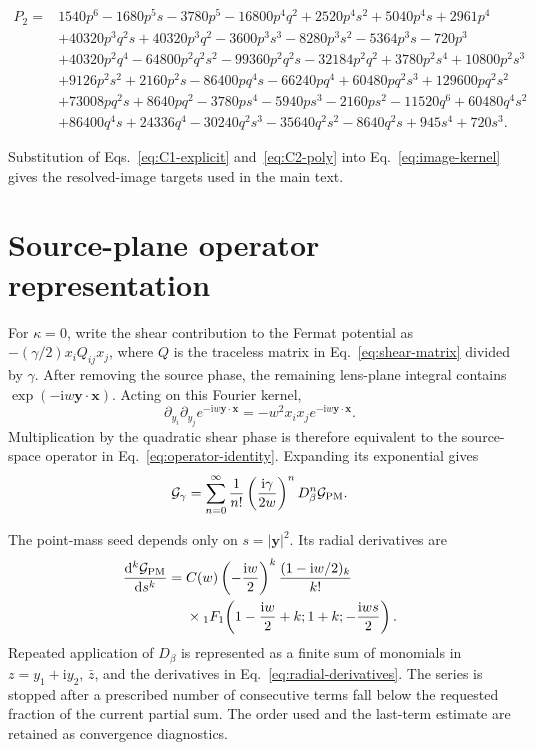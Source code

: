 \documentclass[aps,prd,twocolumn,nofootinbib,superscriptaddress,floatfix]{revtex4-2}
\newcommand{\ii}{\mathrm{i}}
\newcommand{\dd}{\mathrm{d}}
\newcommand{\bx}{\bm{x}}
\newcommand{\by}{\bm{y}}
\newcommand{\cG}{\mathcal{G}}
\begin{document}
\begin{widetext}
\begin{align}
P_2={}&1540p^6-1680p^5s-3780p^5-16800p^4q^2
+2520p^4s^2+5040p^4s+2961p^4\nonumber\\
&+40320p^3q^2s+40320p^3q^2-3600p^3s^3-8280p^3s^2
-5364p^3s-720p^3\nonumber\\
&+40320p^2q^4-64800p^2q^2s^2-99360p^2q^2s-32184p^2q^2
+3780p^2s^4+10800p^2s^3\nonumber\\
&+9126p^2s^2+2160p^2s-86400pq^4s-66240pq^4
+60480pq^2s^3+129600pq^2s^2\nonumber\\
&+73008pq^2s+8640pq^2-3780ps^4-5940ps^3-2160ps^2
-11520q^6+60480q^4s^2\nonumber\\
&+86400q^4s+24336q^4-30240q^2s^3-35640q^2s^2
-8640q^2s+945s^4+720s^3.
 \label{eq:C2-poly}
\end{align}
\end{widetext}

Substitution of Eqs.~\eqref{eq:C1-explicit} and~\eqref{eq:C2-poly} into
Eq.~\eqref{eq:image-kernel} gives the resolved-image targets used in the main
text.

\section{Source-plane operator representation}
\label{app:operator}

For $\kappa=0$, write the shear contribution to the Fermat potential as
$-(\gamma/2)x_iQ_{ij}x_j$, where $Q$ is the traceless matrix in
Eq.~\eqref{eq:shear-matrix} divided by $\gamma$.  After removing the source
phase, the remaining lens-plane integral contains
$\exp(-\ii w\by\cdot\bx)$.  Acting on this Fourier kernel,
\begin{equation}
 \partial_{y_i}\partial_{y_j}e^{-\ii w\by\cdot\bx}
 =-w^2x_ix_j e^{-\ii w\by\cdot\bx}.
\end{equation}
Multiplication by the quadratic shear phase is therefore equivalent to the
source-space operator in Eq.~\eqref{eq:operator-identity}.  Expanding its
exponential gives
\begin{equation}
 \cG_{\gamma}=
 \sum_{n=0}^{\infty}\frac1{n!}
 \left(\frac{\ii\gamma}{2w}\right)^nD_\beta^n\cG_{\rm PM}.
 \label{eq:operator-series}
\end{equation}

The point-mass seed depends only on $s=|\by|^2$.  Its radial derivatives are
\begin{align}
\frac{\dd^k\cG_{\rm PM}}{\dd s^k}={}&
C(w)\left(-\frac{\ii w}{2}\right)^k
\frac{(1-\ii w/2)_k}{k!}\nonumber\\
&\times{}_1F_1\!\left(1-\frac{\ii w}{2}+k;1+k;
-\frac{\ii ws}{2}\right).
 \label{eq:radial-derivatives}
\end{align}
Repeated application of $D_\beta$ is represented as a finite sum of monomials
in $z=y_1+\ii y_2$, $\bar z$, and the derivatives in
Eq.~\eqref{eq:radial-derivatives}.  The series is stopped after a prescribed
number of consecutive terms fall below the requested fraction of the current
partial sum.  The order used and the last-term estimate are retained as
convergence diagnostics.
\end{document}
